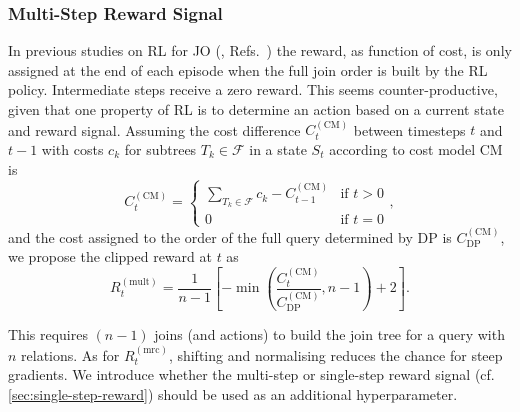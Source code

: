 \documentclass[10pt, conference]{IEEEtran}
\begin{document}
\subsubsection{Multi-Step Reward Signal}
\label{subsec:mod-multistep}

In previous studies on RL for JO (\eg, Refs.~\cite{krishnan18, marcus18, xiang20}) the reward, as function of cost, is only assigned at the end of each episode when the full join order is built by the RL policy. Intermediate steps receive a zero reward.
This seems counter-productive, given that one property of RL is to determine an action based on a current state and reward signal.
Assuming the cost difference $C_t^{(\text{CM})}$ between timesteps $t$ and $t-1$ with costs $c_k$ for subtrees $T_k \in \mathcal{F}$ in a state $S_t$ according to cost model CM is
\begin{equation}
  C_t^{(\text{CM})} = 
  \begin{cases}
    \sum_{T_k \in \mathcal{F}} c_k - C_{t-1}^{(\text{CM})} & \text{if } t > 0 \\
    0 & \text{if } t = 0
  \end{cases},
\end{equation}
and the cost assigned to the order of the full query determined by DP is $C_{\text{DP}}^{(\text{CM})}$, we propose the clipped reward at $t$ as
\begin{equation}
  R_t^{(\text{mult})} = \frac{1}{n-1} \left[-\min\left(\frac{C_t^{(\text{CM})}}{C_{\text{DP}}^{(\text{CM})}}, n-1 \right) + 2\right].
\end{equation}

This requires $(n-1)$ joins (and actions) to build the join tree for a query with $n$ relations.
As for $R_t^{(\text{mrc})}$, shifting and normalising reduces the chance for steep gradients.
We introduce whether the multi-step or single-step reward signal (cf. \autoref{sec:single-step-reward}) should be used as an additional hyperparameter.
\end{document}
